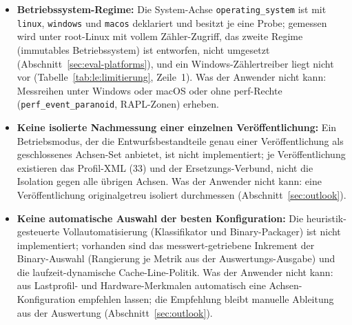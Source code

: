 \begin{nurlang}
\begin{itemize}
  der Router sind nicht implementiert --- Reroute und Router setzen Messkurven voraus. Was der Anwender nicht
  kann: ein Hybrid-Tier betreiben, das zur Laufzeit zwischen vorgeladenen Binaries wechselt; auch die
  Zustands-Übergabe beim Wechsel --- der Memento-Abgleich mit den zwei Release-Artefakten single und
  hybrid im Lager --- ist entworfen, nicht implementiert.
  \item \textbf{Betriebssystem-Regime:} Die System-Achse \texttt{operating\_system} ist mit
  \texttt{linux}, \texttt{windows} und \texttt{macos} deklariert und besitzt je eine Probe; gemessen wird
  unter root-Linux mit vollem Zähler-Zugriff, das zweite Regime (immutables Betriebssystem) ist
  entworfen, nicht umgesetzt (Abschnitt~\ref{sec:eval-platforms}), und ein Windows-Zählertreiber liegt
  nicht vor (Tabelle~\ref{tab:le:limitierung}, Zeile~1). Was der Anwender nicht kann: Messreihen unter
  Windows oder macOS oder ohne perf-Rechte (\texttt{perf\_event\_paranoid}, RAPL-Zonen) erheben.
  \item \textbf{Keine isolierte Nachmessung einer einzelnen Veröffentlichung:} Ein Betriebsmodus, der
  die Entwurfsbestandteile genau einer Veröffentlichung als geschlossenes Achsen-Set anbietet, ist nicht
  implementiert; je Veröffentlichung existieren das Profil-XML (33) und der Ersetzungs-Verbund, nicht die Isolation gegen
  alle übrigen Achsen. Was der Anwender nicht kann: eine Veröffentlichung originalgetreu isoliert durchmessen
  (Abschnitt~\ref{sec:outlook}).
  \item \textbf{Keine automatische Auswahl der besten Konfiguration:} Die heuristik-gesteuerte
  Vollautomatisierung (Klassifikator und Binary-Packager) ist nicht implementiert; vorhanden sind das
  messwert-getriebene Inkrement der Binary-Auswahl (Rangierung je Metrik aus der Auswertungs-Ausgabe)
  und die laufzeit-dynamische Cache-Line-Politik. Was der Anwender nicht kann: aus Lastprofil- und
  Hardware-Merkmalen automatisch eine Achsen-Konfiguration empfehlen lassen; die Empfehlung bleibt
  manuelle Ableitung aus der Auswertung (Abschnitt~\ref{sec:outlook}).
\end{itemize}
\end{nurlang}
